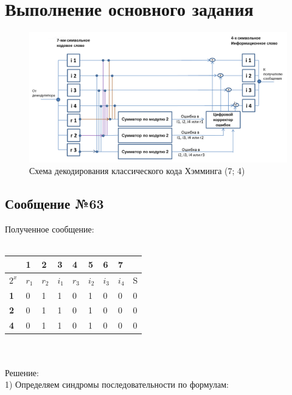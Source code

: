 \documentclass[12pt]{article}
\begin{document}
\section{Выполнение основного задания}

\begin{figure}[h]
    \includegraphics[width=\linewidth]{img/image1.png}
    \caption{Схема декодирования классического кода Хэмминга (7; 4)}
\end{figure}

\subsection{Сообщение №63}

Полученное сообщение: \\
\\
\begin{tabular}{
|p{1cm}|p{1cm}|p{1cm}|p{1cm}|p{1cm}|p{1cm}|p{1cm}|p{1cm}|p{1cm}|}
    \hline
     & 1 & 2 & 3 & 4 & 5 & 6 & 7 & \\
    \hline
    $2^x$ & $r_1$ & $r_2$ & $i_1$ & $r_3$ & $i_2$ & $i_3$ & $i_4$ & S\\
    \hline
    \textbf{1} & \cellcolor{cobalt} 0 & 1 & \cellcolor{cobalt} 1 & 0 & \cellcolor{cobalt} 1 & 0 & \cellcolor{cobalt} 0 & 0\\
    \hline
    \textbf{2} & 0 & \cellcolor{tacao} 1 & \cellcolor{tacao} 1 & 0 & 1 & \cellcolor{tacao} 0 & \cellcolor{tacao} 0 & 0\\
    \hline
    \textbf{4} & 0 & 1 & 1 & \cellcolor{feijoa} 0 & \cellcolor{feijoa} 1 & \cellcolor{feijoa} 0 & \cellcolor{feijoa} 0 & 0\\
    \hline
\end{tabular}
\\
\\
Решение:\\
1) Определяем синдромы последовательности по формулам:
\end{document}
